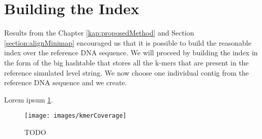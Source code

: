 \section{Building the Index}

Results from the Chapter \ref{kap:proposedMethod} and Section \ref{section:alignMinimap}
encouraged us that it is possible to build the reasonable index over the reference
DNA sequence. We will proceed by building the index in the form of the big hashtable
that stores all the k-mers that are present in the reference simulated level string.
We now choose one individual contig from the reference DNA sequence and we create.

Lorem ipsum \ref{obr:kmerCoverage}.

\begin{figure}
\centerline{\texttt{[image: images/kmerCoverage]}}
\caption[TODO]{TODO}
\label{obr:kmerCoverage}
\end{figure}
